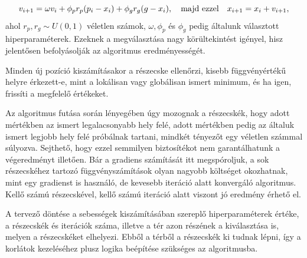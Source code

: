 \begin{equation}
	\label{eq:pso}
	v_{i+1}=\omega v_{i}+\phi _pr_p(p_{i}-x_{i})+\phi_gr_g(g-x_{i}), \quad\textnormal{majd ezzel}\quad x_{i+1}=x_i+v_{i+1},
\end{equation}
ahol $r_p, r_g \sim U(0,1)$ véletlen számok, $\omega, \phi_p$ és $\phi_g$ pedig általunk választott hiperparaméterek. Ezeknek a megválasztása nagy körültekintést igényel, hisz jelentősen befolyásolják az algoritmus eredményességét.

Minden új pozíció kiszámításakor a részecske ellenőrzi, kisebb függvényértékű helyre érkezett-e, mint a lokálisan vagy globálisan ismert minimum, és ha igen, frissíti a megfelelő értékeket.

Az algoritmus futása során lényegében úgy mozognak a részecskék, hogy adott mértékben az ismert legalacsonyabb hely felé, adott mértékben pedig az általuk ismert legjobb hely felé próbálnak tartani, mindkét tényezőt egy véletlen számmal súlyozva. Sejthető, hogy ezzel semmilyen biztosítékot nem garantálhatunk a végeredményt illetően. Bár a gradiens számítását itt megspóroljuk, a sok részecskéhez tartozó függvényszámítások olyan nagyobb költséget okozhatnak, mint egy gradienst is használó, de kevesebb iteráció alatt konvergáló algoritmus. Kellő számú részecskével, kellő számú iteráció alatt viszont jó eredmény érhető el.

A tervező döntése a sebességek kiszámításában szereplő hiperparaméterek értéke, a részecskék és iterációk száma, illetve a tér azon részének a kiválasztása is, melyen a részecskéket elhelyezi. Ebből a térből a részecskék ki tudnak lépni, így a korlátok kezeléséhez plusz logika beépítése szükséges az algoritmusba.

